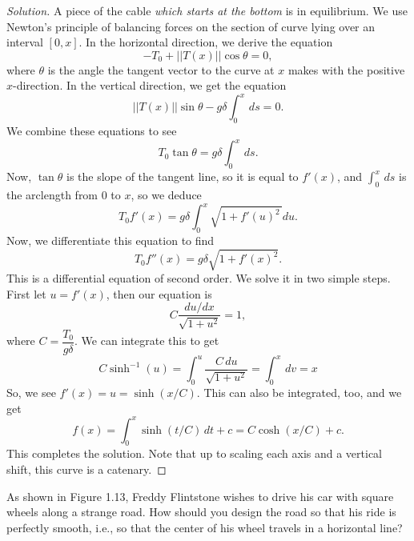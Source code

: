 \documentclass[Shifrin_Solutions_Spring_2018]{subfiles}
\begin{document}
\begin{proof}[Solution]
A piece of the cable \emph{which starts at the bottom} is in equilibrium. We use Newton's principle of balancing forces on the section of curve lying over an interval $[0,x]$.
In the horizontal direction, we derive the equation
\[
-T_0 + ||T(x)||\cos\theta = 0 ,
\]
where $\theta$ is the angle the tangent vector to the curve at $x$ makes with the positive $x$-direction.
In the vertical direction, we get the equation
\[
||T(x)|| \sin\theta   - g\delta \int_0^x \, ds = 0 .
\]
We combine these equations to see
\[
T_0  \tan\theta  = g \delta \int_0^x \, ds .
\]
Now, $\tan\theta$ is the slope of the tangent line, so it is equal to $f'(x)$, and $\int_0^x \, ds$ is the arclength from $0$ to $x$, so we deduce
\[
T_0 f'(x) = g \delta \int_0^x \sqrt{ 1 + f'(u)^2\, } du .
\]
Now, we differentiate this equation to find
\[
T_0 f''(x) = g \delta \sqrt{1+ f'(x)^2 }.
\]
This is a differential equation of second order. We solve it in two simple steps. First let $u = f'(x)$, then our equation is
\[
C\dfrac{du/dx}{\sqrt{1+u^2 }}  = 1,
\]
where $C =  \dfrac{T_0}{g\delta}$.
We can integrate this to get
\[
C \sinh^{-1}(u) = \int_0^u \dfrac{C \, du}{\sqrt{1+u^2}} = \int_0^x \, dv = x
\]
So, we see $f'(x) = u = \sinh(x/C)$. This can also be integrated, too, and we get
\[
f(x) = \int_0^x \sinh(t/C) \, dt + c = C \cosh(x/C) + c .
\]
This completes the solution. Note that up to scaling each axis and a vertical shift, this curve is a catenary.
\end{proof}





\begin{exercise}
As shown in Figure 1.13, Freddy Flintstone wishes to drive his car with square wheels along a strange road. How should you design the road so that his ride is perfectly smooth, i.e., so that the center of his wheel travels in a horizontal line?
\end{exercise}
\end{document}
